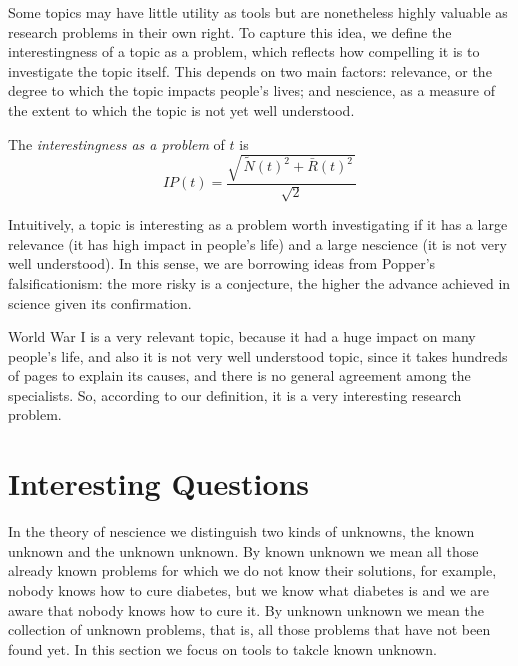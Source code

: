 Some topics may have little utility as tools but are nonetheless highly valuable as research problems in their own right. To capture this idea, we define the interestingness of a topic as a problem, which reflects how compelling it is to investigate the topic itself. This depends on two main factors: relevance, or the degree to which the topic impacts people's lives; and nescience, as a measure of the extent to which the topic is not yet well understood.

\begin{definition}
The \emph{interestingness as a problem} of $t$ is
\[
IP(t)=\frac{\sqrt{\,\tilde{N}(t)^2+\bar{R}(t)^2\,}}{\sqrt{2}}
\]
\end{definition}

Intuitively, a topic is interesting as a problem worth investigating if it has a large relevance (it has high impact in people's life) and a large nescience (it is not very well understood). In this sense, we are borrowing ideas from Popper's falsificationism: the more risky is a conjecture, the higher the advance achieved in science given its confirmation.

\begin{example}
World War I is a very relevant topic, because it had a huge impact on many people's life, and also it is not very well understood topic, since it takes hundreds of pages to explain its causes, and there is no general agreement among the specialists. So, according to our definition, it is a very interesting research problem.
\end{example}

%
%

\section{Interesting Questions}
\label{sec:interestingness-metrics}

In the theory of nescience we distinguish two kinds of unknowns, the known unknown and the unknown unknown. By known unknown we mean all those already known problems for which we do not know their solutions, for example, nobody knows how to cure diabetes, but we know what diabetes is and we are aware that nobody knows how to cure it. By unknown unknown we mean the collection of unknown problems, that is, all those problems that have not been found yet. In this section we focus on tools to takcle known unknown.

